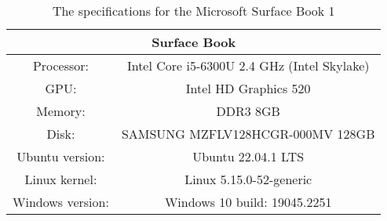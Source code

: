 \begin{table}[H]
    \centering
    \begin{tabular}{|| c | c ||}
    \hline
    \multicolumn{2}{||c||}{Surface Book}           \\ [0.5ex] \hline\hline
    Processor:      & Intel Core i5-6300U 2.4 GHz (Intel Skylake)      \\
    GPU:            & Intel HD Graphics 520          \\
    Memory:         & DDR3 8GB                         \\
    Disk:           & SAMSUNG MZFLV128HCGR-000MV 128GB \\
    Ubuntu version:  & Ubuntu 22.04.1 LTS                \\
    Linux kernel: & Linux 5.15.0-52-generic       \\
    Windows version:& Windows 10 build: 19045.2251 \\ \hline
    \end{tabular}
    \caption{The specifications for the Microsoft Surface Book 1}
    \label{tab:surfaceBook}
\end{table} 